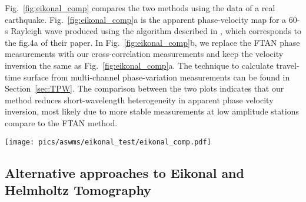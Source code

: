 Fig.~\ref{fig:eikonal_comp} compares the two methods using the data of a real earthquake. Fig.~\ref{fig:eikonal_comp}a is the apparent phase-velocity map for a 60-s Rayleigh wave produced using the algorithm described in \citet{Lin:2011fw}, which corresponds to the fig.4a of their paper. In Fig.~\ref{fig:eikonal_comp}b, we replace the FTAN phase measurements with our cross-correlation measurements and keep the velocity inversion the same as Fig.~\ref{fig:eikonal_comp}a. The technique to calculate travel-time surface from multi-channel phase-variation measurements can be found in Section~\ref{sec:TPW}. The comparison between the two plots indicates that our method reduces short-wavelength heterogeneity in apparent phase velocity inversion, most likely due to more stable measurements at low amplitude stations compare to the FTAN method. 


\begin{figure*}
	\texttt{[image: pics/aswms/eikonal\_test/eikonal\_comp.pdf]}
	\caption{60-s Rayleigh-wave Eikonal tomography results for the April 7, 2009 earthquake near Kuril Islands ($M_s$=6.8), using different phase measuring and tomographic inversions techniques.\textbf{a)} Phase measurement: FTAN; Tomography: gradient of the travel-time surface. \textbf{b)} Phase measurement: cross-correlation; Tomography: gradient of the travel-time surface. \textbf{c)}Phase measurement: cross-correlation; Tomography: slowness vector inversion.}
	\label{fig:eikonal_comp}
\end{figure*}

\subsection{Alternative approaches to Eikonal and Helmholtz Tomography}
\label{sec:helm_dis}

